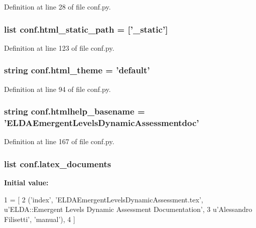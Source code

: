 Definition at line 28 of file conf.\-py.

\hypertarget{a00132_af4fb5d8851ccaade135c2668dd3ced41}{
\subsubsection[{html\-\_\-static\-\_\-path}]{\setlength{\rightskip}{0pt plus 5cm}list conf.\-html\-\_\-static\-\_\-path = \mbox{[}'\-\_\-static'\mbox{]}}}\label{a00132_af4fb5d8851ccaade135c2668dd3ced41}


Definition at line 123 of file conf.\-py.

\hypertarget{a00132_a6c3bfcc1a44546c1c75ce20f55bd0fd6}{
\subsubsection[{html\-\_\-theme}]{\setlength{\rightskip}{0pt plus 5cm}string conf.\-html\-\_\-theme = 'default'}}\label{a00132_a6c3bfcc1a44546c1c75ce20f55bd0fd6}


Definition at line 94 of file conf.\-py.

\hypertarget{a00132_aab7fddb2766ce3c430d8246fbfdbc7b1}{
\subsubsection[{htmlhelp\-\_\-basename}]{\setlength{\rightskip}{0pt plus 5cm}string conf.\-htmlhelp\-\_\-basename = 'E\-L\-D\-A\-Emergent\-Levels\-Dynamic\-Assessmentdoc'}}\label{a00132_aab7fddb2766ce3c430d8246fbfdbc7b1}


Definition at line 167 of file conf.\-py.

\hypertarget{a00132_a7812f49970f3de0d15dd7b9b9a10e3a1}{
\subsubsection[{latex\-\_\-documents}]{\setlength{\rightskip}{0pt plus 5cm}list conf.\-latex\-\_\-documents}}\label{a00132_a7812f49970f3de0d15dd7b9b9a10e3a1}
{\bfseries Initial value\-:}
\begin{DoxyCode}
1 = [
2   (\textcolor{stringliteral}{'index'}, \textcolor{stringliteral}{'ELDAEmergentLevelsDynamicAssessment.tex'}, \textcolor{stringliteral}{u'ELDA::Emergent Levels Dynamic Assessment
       Documentation'},
3    \textcolor{stringliteral}{u'Alessandro Filisetti'}, \textcolor{stringliteral}{'manual'}),
4 ]
\end{DoxyCode}



